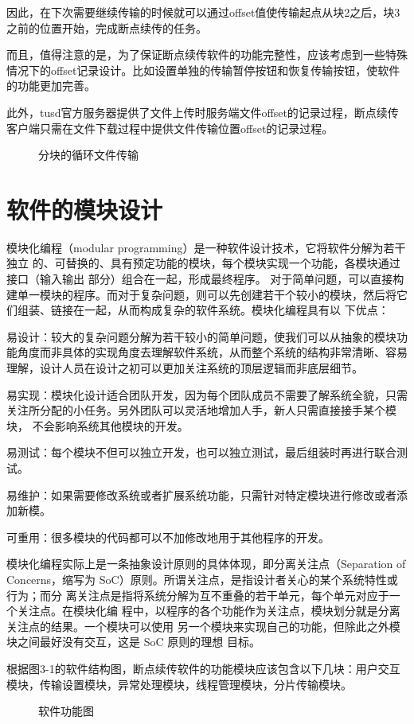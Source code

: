 \documentclass[bachelor]{thesis-uestc}
\begin{document}
\par 因此，在下次需要继续传输的时候就可以通过offset值使传输起点从块2之后，块3之前的位置开始，完成断点续传的任务。
\par 而且，值得注意的是，为了保证断点续传软件的功能完整性，应该考虑到一些特殊情况下的offset记录设计。比如设置单独的传输暂停按钮和恢复传输按钮，使软件的功能更加完善。
\par 此外，tusd官方服务器提供了文件上传时服务端文件offset的记录过程，断点续传客户端只需在文件下载过程中提供文件传输位置offset的记录过程。
\begin{figure}[h]
\caption{分块的循环文件传输}
\end{figure}



\section{软件的模块设计}
模块化编程（modular programming）是一种软件设计技术，它将软件分解为若干独立 的、可替换的、具有预定功能的模块，每个模块实现一个功能，各模块通过接口（输入输出 部分）组合在一起，形成最终程序。
对于简单问题，可以直接构建单一模块的程序。而对于复杂问题，则可以先创建若干个较小的模块，然后将它们组装、链接在一起，从而构成复杂的软件系统。模块化编程具有以 下优点：
\par 易设计：较大的复杂问题分解为若干较小的简单问题，使我们可以从抽象的模块功 能角度而非具体的实现角度去理解软件系统，从而整个系统的结构非常清晰、容易 理解，设计人员在设计之初可以更加关注系统的顶层逻辑而非底层细节。
\par 易实现：模块化设计适合团队开发，因为每个团队成员不需要了解系统全貌，只需 关注所分配的小任务。另外团队可以灵活地增加人手，新人只需直接接手某个模块， 不会影响系统其他模块的开发。
\par 易测试：每个模块不但可以独立开发，也可以独立测试，最后组装时再进行联合测 试。
\par 易维护：如果需要修改系统或者扩展系统功能，只需针对特定模块进行修改或者添 加新模。
\par 可重用：很多模块的代码都可以不加修改地用于其他程序的开发。
\par 模块化编程实际上是一条抽象设计原则的具体体现，即分离关注点（Separation of Concerns，缩写为 SoC）原则。所谓关注点，是指设计者关心的某个系统特性或行为；而分 离关注点是指将系统分解为互不重叠的若干单元，每个单元对应于一个关注点。在模块化编 程中，以程序的各个功能作为关注点，模块划分就是分离关注点的结果。一个模块可以使用 另一个模块来实现自己的功能，但除此之外模块之间最好没有交互，这是 SoC 原则的理想 目标。
\par 根据图3-1的软件结构图，断点续传软件的功能模块应该包含以下几块：用户交互模块，传输设置模块，异常处理模块，线程管理模块，分片传输模块。
\begin{figure}[h]
\caption{软件功能图}
\end{figure}
\end{document}
